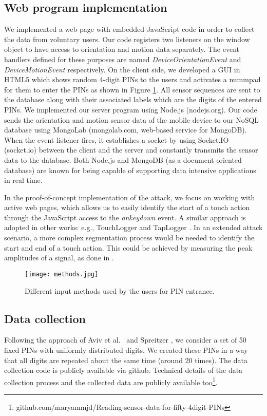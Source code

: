 \documentclass[10pt,twocolumn]{article}
\begin{document}
\subsection{Web program implementation}
We implemented a web page with embedded JavaScript code in order to collect the data from voluntary users. Our code registers two listeners on the window object to have access to orientation and motion data separately.  
The event handlers defined for these purposes are named \textit{DeviceOrientationEvent} and \textit{DeviceMotionEvent} respectively. 
On the client side, we developed a GUI in HTML5 which shows random 4-digit PINs to the users and activates a nummpad for them to enter the PINs as shown in Figure \ref{Inputmethods}. 
All sensor sequences are sent to the database along with their associated labels which are the digits of the entered PINs. 
We implemented our server program using Node.js (nodejs.org). Our code sends the orientation and motion sensor data of
the mobile device to our NoSQL database using MongoLab (mongolab.com, web-based service for MongoDB). 
When the event listener fires, it establishes a socket by using Socket.IO (socket.io) between the client and the server and constantly transmits the sensor data to the database. Both Node.js and MongoDB (as a document-oriented database) 
are known for being capable of supporting data intensive applications in real time. 

In the proof-of-concept implementation of the attack, we focus on working with active web pages, which allows us to easily identify the start of a touch action through the JavaScript access to the \textit{onkeydown} event. 
A similar approach is adopted in other works: e.g., TouchLogger
\cite{touchlogger} and TapLogger \cite{taplogger}. In an extended attack scenario, a more complex segmentation process would be needed to identify the start and end of a touch action. This could be achieved by measuring the peak amplitudes of a signal, as done in \cite{KeyMic}. 

\begin{figure}[t]
	\centering
	\texttt{[image: methods.jpg]}
	\caption{Different input methods used by the users for PIN entrance.}
	\label{Inputmethods}
\end{figure}
\subsection{Data collection}
Following the approach of Aviv et al.~\cite{Tapprints2} and Spreitzer \cite{SkimLight}, we consider a set of 50 fixed PINs with uniformly distributed digits. We created these PINs in a way that all digits are repeated about the same time (around 20 times). The data collection code is publicly available via github. Technical details of the data collection process and the collected data are publicly available too\footnote{github.com/maryammjd/Reading-sensor-data-for-fifty-4digit-PINs}. 
\end{document}

